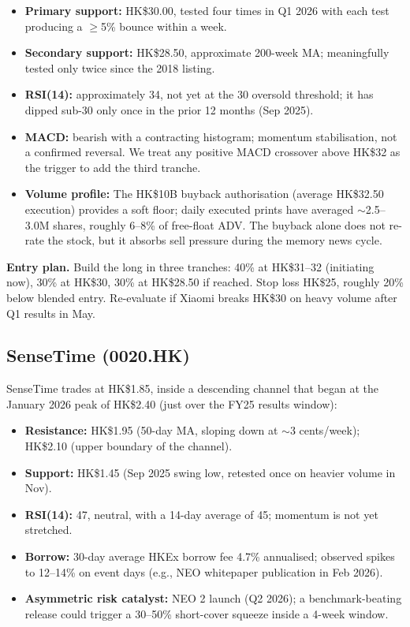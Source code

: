 \documentclass[11pt,a4paper]{article}
\begin{document}
\begin{itemize}
\item \textbf{Primary support:} HK\$30.00, tested four times in Q1 2026 with each test producing a $\geq$5\% bounce within a week.
\item \textbf{Secondary support:} HK\$28.50, approximate 200-week MA; meaningfully tested only twice since the 2018 listing.
\item \textbf{RSI(14):} approximately 34, not yet at the 30 oversold threshold; it has dipped sub-30 only once in the prior 12 months (Sep 2025).
\item \textbf{MACD:} bearish with a contracting histogram; momentum stabilisation, not a confirmed reversal. We treat any positive MACD crossover above HK\$32 as the trigger to add the third tranche.
\item \textbf{Volume profile:} The HK\$10B buyback authorisation (average HK\$32.50 execution) provides a soft floor; daily executed prints have averaged $\sim$2.5--3.0M shares, roughly 6--8\% of free-float ADV. The buyback alone does not re-rate the stock, but it absorbs sell pressure during the memory news cycle.
\end{itemize}

\textbf{Entry plan.} Build the long in three tranches: 40\% at HK\$31--32 (initiating now), 30\% at HK\$30, 30\% at HK\$28.50 if reached. Stop loss HK\$25, roughly 20\% below blended entry. Re-evaluate if Xiaomi breaks HK\$30 on heavy volume after Q1 results in May.

\subsection{SenseTime (0020.HK)}

SenseTime trades at HK\$1.85, inside a descending channel that began at the January 2026 peak of HK\$2.40 (just over the FY25 results window):

\begin{itemize}
\item \textbf{Resistance:} HK\$1.95 (50-day MA, sloping down at $\sim$3 cents/week); HK\$2.10 (upper boundary of the channel).
\item \textbf{Support:} HK\$1.45 (Sep 2025 swing low, retested once on heavier volume in Nov).
\item \textbf{RSI(14):} 47, neutral, with a 14-day average of 45; momentum is not yet stretched.
\item \textbf{Borrow:} 30-day average HKEx borrow fee 4.7\% annualised; observed spikes to 12--14\% on event days (e.g., NEO whitepaper publication in Feb 2026).
\item \textbf{Asymmetric risk catalyst:} NEO 2 launch (Q2 2026); a benchmark-beating release could trigger a 30--50\% short-cover squeeze inside a 4-week window.
\end{itemize}
\end{document}
